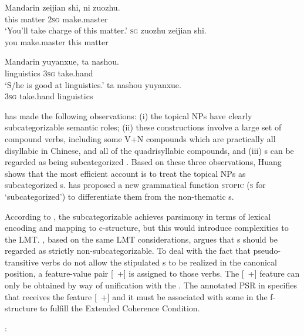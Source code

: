 \documentclass[output=paper,chinesefont,hidelinks]{langscibook}
\begin{document}
\ea%
    \label{ex:Sinitic:12}Mandarin
\ea    \gll zeijian shi,   ni  zuozhu.\\
         this   matter 2\textsc{sg} make.master\\
         \glt `You'll take charge of this matter.' 
         \ex {}\textsc{sg}  zuozhu      zeijian  shi.\\
         you make.master this   matter\\
    \z\z

\ea%
    \label{ex:Sinitic:13}Mandarin
\ea    \gll yuyanxue,  ta  nashou. \\
         linguistics 3\textsc{sg}  take.hand\\
    \glt `S/he is good at linguistics.'
\ex    \gll *ta   nashou   yuyanxue.\\
         3\textsc{sg}  take.hand  linguistics\\
    \z\z

\citet{Huang1989b} has made the following observations: (i) the topical NPs have clearly subcategorizable semantic roles; (ii) these constructions involve a large set of compound verbs,  including some V+N compounds which are practically all disyllabic in Chinese, and all of the quadrisyllabic compounds, and (iii)  {\TOPIC}s can be regarded as being subcategorized \citep{bresnan1982control-complementation}. Based on these three observations, Huang shows that the most efficient account is to treat the topical NPs as subcategorized {\TOPIC}s. \citet{Mo1990} has proposed a new grammatical function \textsc{stopic} (\textsc{s} for `subcategorized') to differentiate them from the non-thematic {\TOPIC}s.

According to \citet{Huang1989b}, the subcategorizable {\TOPIC} achieves parsimony in terms of lexical encoding and mapping to c-structure, but this would introduce complexities to the LMT. \citet{Her1991,Her2010}, based on the same LMT considerations, argues that {\TOPIC}s should be regarded as strictly non-subcategorizable. To deal with the fact that pseudo-transitive verbs do not allow the stipulated {\OBJ}s to be realized in the canonical {\OBJ} position, a feature-value pair [\FRAME~+] is assigned to those verbs. The [\FRAME~+] feature can only be obtained by way of unification with the {\TOPIC}. The annotated PSR in  specifies that {\TOPIC} receives the feature [\FRAME~+] and it must be associated with some {\GF} in the f-structure to fulfill the Extended Coherence Condition.

\ea%
\label{ex:Sinitic:14}
\citet{Her2010}:
\ea\label{ex:Sinitic:14a}  
\ex\label{ex:Sinitic:14b} 
\z\z
\end{document}
